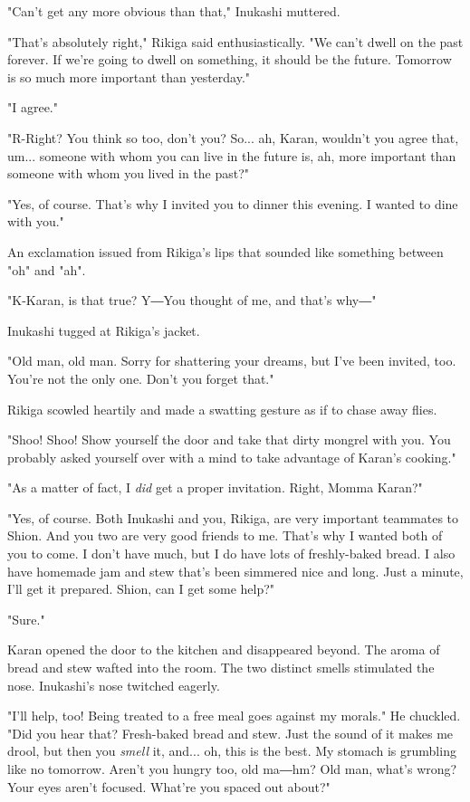 "Can't get any more obvious than that," Inukashi muttered.

"That's absolutely right," Rikiga said enthusiastically. "We can't dwell
on the past forever. If we're going to dwell on something, it should be
the future. Tomorrow is so much more important than yesterday."

"I agree."

"R-Right? You think so too, don't you? So... ah, Karan, wouldn't you
agree that, um... someone with whom you can live in the future is, ah,
more important than someone with whom you lived in the past?"

"Yes, of course. That's why I invited you to dinner this evening. I
wanted to dine with you."

An exclamation issued from Rikiga's lips that sounded like something
between "oh" and "ah".

"K-Karan, is that true? Y―You thought of me, and that's why―"

Inukashi tugged at Rikiga's jacket.

"Old man, old man. Sorry for shattering your dreams, but I've been
invited, too. You're not the only one. Don't you forget that."

Rikiga scowled heartily and made a swatting gesture as if to chase away
flies.

"Shoo! Shoo! Show yourself the door and take that dirty mongrel with
you. You probably asked yourself over with a mind to take advantage of
Karan's cooking."

"As a matter of fact, I \emph{did} get a proper invitation. Right, Momma
Karan?"

"Yes, of course. Both Inukashi and you, Rikiga, are very important
teammates to Shion. And you two are very good friends to me. That's why
I wanted both of you to come. I don't have much, but I do have lots of
freshly-baked bread. I also have homemade jam and stew that's been
simmered nice and long. Just a minute, I'll get it prepared. Shion, can
I get some help?"

"Sure."

Karan opened the door to the kitchen and disappeared beyond. The aroma
of bread and stew wafted into the room. The two distinct smells
stimulated the nose. Inukashi's nose twitched eagerly.

"I'll help, too! Being treated to a free meal goes against my morals."
He chuckled. "Did you hear that? Fresh-baked bread and stew. Just the
sound of it makes me drool, but then you \emph{smell} it, and... oh, this is
the best. My stomach is grumbling like no tomorrow. Aren't you hungry
too, old ma―hm? Old man, what's wrong? Your eyes aren't focused. What're
you spaced out about?"

